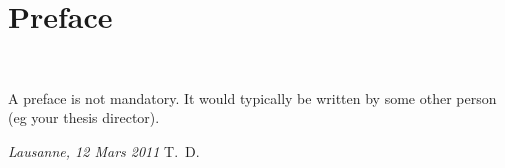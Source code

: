 \chapter*{Preface}
~\newline~\newline~
A preface is not mandatory. It would typically be written by some other person (eg your thesis director).

\lipsum[1-2]

\bigskip
 
\noindent\textit{Lausanne, 12 Mars 2011}
\hfill T.~D.

